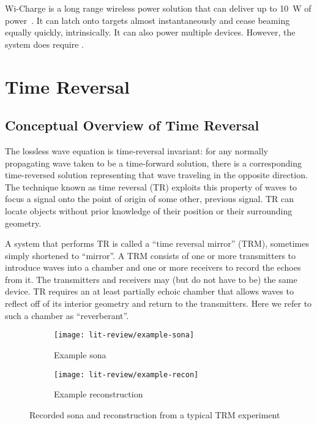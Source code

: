 Wi-Charge is a long range wireless power solution that can deliver up to 10~W of power~\cite{wicharge2016}. It can latch onto targets almost instantaneously and cease beaming equally quickly, intrinsically. It can also power multiple devices. However, the system does require \los.

\section{Time Reversal}
\label{lit-review-tr}

\subsection{Conceptual Overview of Time Reversal}

The lossless wave equation is time-reversal invariant: for any normally propagating wave taken to be a time-forward solution, there is a corresponding time-reversed solution representing that wave traveling in the opposite direction. The technique known as time reversal (TR) exploits this property of waves to focus a signal onto the point of origin of some other, previous signal. TR can locate objects without prior knowledge of their position or their surrounding geometry.

A system that performs TR is called a ``time reversal mirror'' (TRM), sometimes simply shortened to ``mirror''. A TRM consists of one or more transmitters to introduce waves into a chamber and one or more receivers to record the echoes from it. The transmitters and receivers may (but do not have to be) the same device. TR requires an at least partially echoic chamber that allows waves to reflect off of its interior geometry and return to the transmitters. Here we refer to such a chamber as ``reverberant''.

\begin{figure}
    \centering
    \begin{subfigure}{.85\textwidth}
        \centering
        \texttt{[image: lit-review/example-sona]}
        \caption[Example sona]{Example sona}
         \label{fig:lit-review-example-sona}
    \end{subfigure}
		\par\bigskip
    \begin{subfigure}{.85\textwidth}
        \centering
        \texttt{[image: lit-review/example-recon]}
        \caption[Example reconstruction]{Example reconstruction}
         \label{fig:lit-review-example-recon}
    \end{subfigure}
    \caption{Recorded sona and reconstruction from a typical TRM experiment}
    \label{fig:lit-review-example}
\end{figure}

